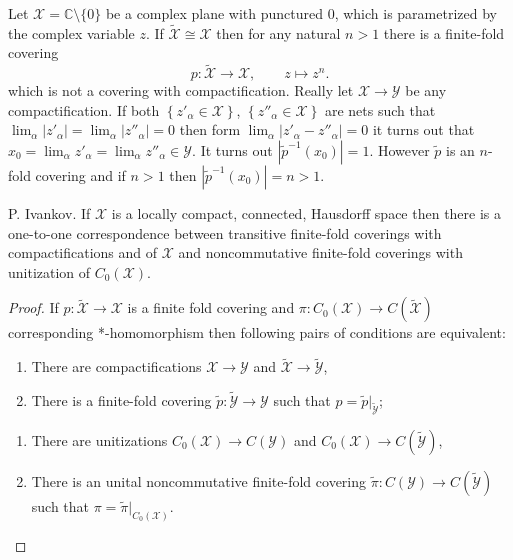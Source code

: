 \documentclass{beamer}
\theoremstyle{plain}
\newcommand{\C}{\mathbb{C}}
\newcommand{\al}{\alpha}
\begin{document}
\begin{frame}
\begin{example}
	
	Let $\mathcal X  = \C \setminus \{0\}$ be a complex plane with punctured 0, which is parametrized by the complex variable $z$. 
	If $\widetilde{   \mathcal X } \cong \mathcal X$ then for any natural $n>1$ there is a finite-fold covering 
	\begin{equation*}
	p: \widetilde{   \mathcal X } \to \mathcal X,
	\qquad	z \mapsto z^n.
	\end{equation*}
	which is not a covering with compactification. Really let  $\mathcal X \to\mathcal Y$ be any compactification. If both $\left\{z'_\al \in \mathcal X\right\}$, 	$\left\{z''_\al \in \mathcal X\right\}$ are  nets such that $\lim_{\al}\left|z'_\al\right|=\lim_\al\left|z''_\al\right| = 0$ then form $\lim_{\al}\left|z'_\al-z''_\al\right|= 0$ it turns out that
	$
	x_0 = \lim_{\al} z'_\al = \lim_{\al} z''_\al \in \mathcal Y
	$. 	It turns out $\left|\widetilde{p}^{-1}\left(x_0 \right) \right|=1$. However $\widetilde{p}$ is an $n$-fold covering and if $n >1$ then  $\left|\widetilde{p}^{-1}\left(x_0 \right) \right|=n>1$.
\end{example}
\end{frame}
\begin{frame}
\begin{lemma}
	\alert{P. Ivankov}. If $\mathcal X$ is a locally compact, connected, Hausdorff space then there is a one-to-one correspondence between transitive finite-fold coverings with compactifications and of $\mathcal X$ and noncommutative finite-fold coverings with unitization of $C_0\left(\mathcal X\right)$.
\end{lemma}
\begin{proof}
	If $p: \widetilde{   \mathcal X }\to  \mathcal X$ is a finite fold covering and $\pi: C_0\left({   \mathcal X }\right)  \to C\left( \widetilde{   \mathcal X }\right)$ corresponding *-homomorphism then
following pairs of conditions are equivalent:
\begin{enumerate}
	\item There are compactifications ${   \mathcal X } \to {   \mathcal Y }$ and $\widetilde{   \mathcal X } \to \widetilde{   \mathcal Y }$,
	\item There is a finite-fold  covering $\widetilde{p}:\widetilde{   \mathcal Y }\to {   \mathcal Y }$ such that $p= \widetilde{p}|_{\widetilde{   \mathcal Y }}$;
\end{enumerate}
\begin{enumerate}
	\item There are unitizations $C_0\left( {   \mathcal X } \right) \to C\left(  {   \mathcal Y }\right) $ and $C_0\left({   \mathcal X }\right)  \to C\left( \widetilde{   \mathcal Y }\right) $,
	\item There is an unital noncommutative finite-fold  covering $\widetilde{\pi}:C\left({   \mathcal Y } \right)\to C\left(  \widetilde{   \mathcal Y }\right) $ such that $\pi= \widetilde{\pi}|_{C_0\left( {\mathcal X}\right)  }$.
\end{enumerate}

\end{proof}

\end{frame}
\end{document}
